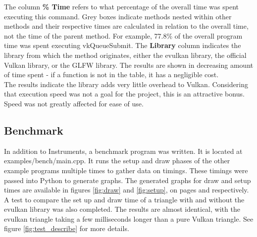\documentclass[12pt]{report}
\theoremstyle{definition}
\begin{document}
        The column \textbf{\% Time} refers to what percentage of the overall time was
        spent executing this command. Grey boxes indicate methods nested
        within other methods and their respective times are calculated in
        relation to the overall time, not the time of the parent method.
        For example, 77.8\% of the overall program time was spent executing
        vkQueueSubmit. The \textbf{Library} column indicates the library from which
        the method originates, either the evulkan library, the official Vulkan
        library, or the GLFW library. The results are shown in decreasing
        amount of time spent - if a function is not in the table, it has a
        negligible cost. \\

        The results indicate the library adds very little overhead to Vulkan.
        Considering that execution speed was not a goal for the project,
        this is an attractive bonus. Speed was not greatly affected for
        ease of use.

      \subsection{Benchmark}

        In addition to Instruments, a benchmark program was written. It is
        located at examples/bench/main.cpp. It runs the setup and draw
        phases of the other example programs multiple times to gather
        data on timings. These timings were passed into Python to
        generate graphs. The generated graphs for draw and setup times are available in figures \ref{fig:draw}
        and \ref{fig:setup}, on pages \pageref{fig:draw} and \pageref{fig:setup} respectively. \\

        A test to compare the set up and draw time of a triangle with and
        without the evulkan library was also completed. The results are
        almost identical, with the evulkan triangle taking a few milliseconds
        longer than a pure Vulkan triangle. See figure \ref{fig:test_describe} 
        for more details. \\
\end{document}

